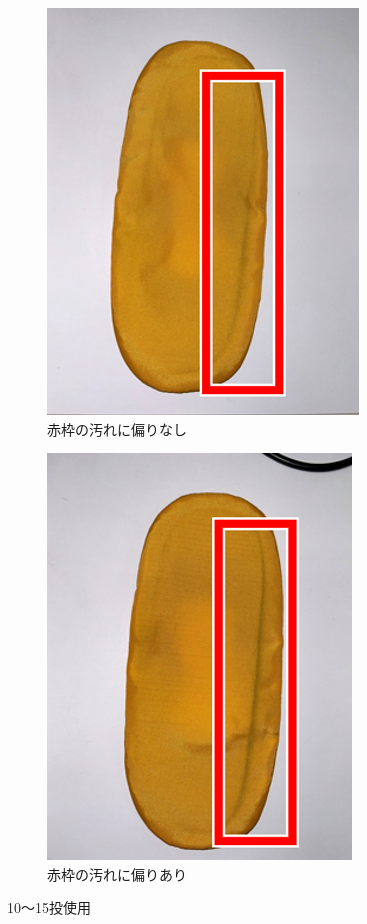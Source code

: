 \documentclass[main]{subfiles}
\begin{document}
\begin{figure}[htbp]
    \centering
    \begin{subfigure}[htbp]{0.3\linewidth}
        \centering
        \includegraphics[keepaspectratio, width=0.8\linewidth, height=\linewidth]{figures/caring_brush_pad/10~15Akousatu.png}
        \caption{赤枠の汚れに偏りなし}
        \label{fig:labelX}
    \end{subfigure}
    \begin{subfigure}[htbp]{0.3\linewidth}
        \centering
        \includegraphics[keepaspectratio, width=0.8\linewidth, height=\linewidth]{figures/caring_brush_pad/10~15Bkousatu.png}
        \caption{赤枠の汚れに偏りあり}
        \label{fig:labelY}
    \end{subfigure}
    \caption{10～15投使用}
    \label{fig:label}
\end{figure}
\end{document}
